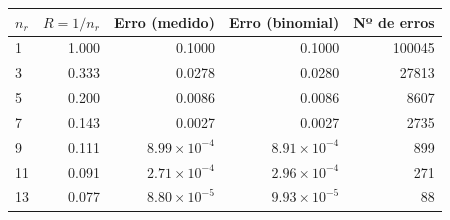 \begin{tabular}{lrrrr}
\toprule
$n_r$ & $R=1/n_r$ & Erro (medido) & Erro (binomial) & Nº de erros \\
\midrule
1 & 1.000 & 0.1000 & 0.1000 & 100045 \\
3 & 0.333 & 0.0278 & 0.0280 & 27813 \\
5 & 0.200 & 0.0086 & 0.0086 & 8607 \\
7 & 0.143 & 0.0027 & 0.0027 & 2735 \\
9 & 0.111 & $8.99\times 10^{-4}$ & $8.91\times 10^{-4}$ & 899 \\
11 & 0.091 & $2.71\times 10^{-4}$ & $2.96\times 10^{-4}$ & 271 \\
13 & 0.077 & $8.80\times 10^{-5}$ & $9.93\times 10^{-5}$ & 88 \\
\bottomrule
\end{tabular}
